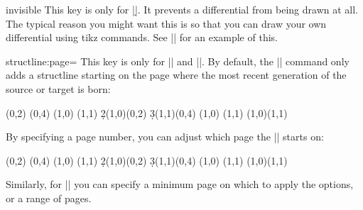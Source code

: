\documentclass{ltxdoc}
\begin{document}
\begin{sseqdata}[name=ex1,degree={#1}{1-#1}]
\begin{key}{invisible}
This key is only for |\d|. It prevents a differential from being drawn at all. The typical reason you might want this is so that you can draw your own differential using tikz commands. See |\getdtarget| for an example of this.
\end{key}

\begin{key}{structline:page=}
This key is only for |\structline| and |\structlineoptions|. By default, the |\structline| command only adds a structline starting on the page where the most recent generation of the source or target is born:

\begin{codeexample}[width=7.6cm]
\begin{sseqdata}[name=structpage example,title=\page]
\class(0,2)
\class(0,4)
\class(1,0)
\class(1,1)
\d2(1,0)(0,2)
\d3(1,1)(0,4)
\replaceclass(1,0)
\replaceclass(1,1)
\structline(1,0)(1,1)
\end{sseqdata}
\printpage[name=structpage example,page=3]
\qquad
\printpage[name=structpage example,page=4]
\end{codeexample}

By specifying a page number, you can adjust which page the |\structline| starts on:

\begin{codeexample}[]
\begin{sseqdata}[name=structpage example2,title=\page]
\class(0,2)
\class(0,4)
\class(1,0)
\class(1,1)
\d2(1,0)(0,2)
\d3(1,1)(0,4)
\replaceclass(1,0)
\replaceclass(1,1)
\structline[structline:page=2](1,0)(1,1)
\end{sseqdata}
\printpage[name=structpage example2,page=1]
\qquad
\printpage[name=structpage example2,page=2]
\qquad
\printpage[name=structpage example2,page=3]
\qquad
\printpage[name=structpage example2,page=4]
\end{codeexample}

Similarly, for |\structlineoptions| you can specify a minimum page on which to apply the options, or a range of pages.
\end{key}


\end{sseqdata}
\end{document}
